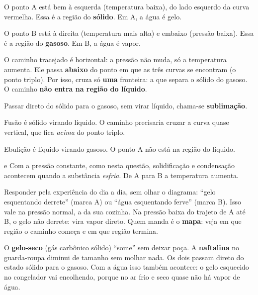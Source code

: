 \passoapasso
{}
O ponto A está bem à esquerda (temperatura baixa), do lado esquerdo da curva vermelha. Essa é a região do \textbf{sólido}. Em A, a água é gelo.

O ponto B está à direita (temperatura mais alta) e embaixo (pressão baixa). Essa é a região do \textbf{gasoso}. Em B, a água é vapor.

O caminho tracejado é horizontal: a pressão não muda, só a temperatura aumenta. Ele passa \textbf{abaixo} do ponto em que as
três curvas se encontram (o ponto triplo). Por isso, cruza só \textbf{uma} fronteira: a que separa o sólido do gasoso.
O caminho \textbf{não entra na região do líquido}.

Passar direto do sólido para o gasoso, sem virar líquido, chama-se \textbf{sublimação}.


\begin{outras}
 Fusão é sólido virando líquido. O caminho precisaria cruzar a curva quase vertical, que fica \emph{acima} do ponto triplo.\par
{} Ebulição é líquido virando gasoso. O ponto A não está na região do líquido.\par
{} e  Com a pressão constante, como nesta questão, solidificação e condensação acontecem quando a substância \emph{esfria}. De A para B a temperatura aumenta.
\end{outras}

\begin{pegadinha}
Responder pela experiência do dia a dia, sem olhar o diagrama: ``gelo esquentando derrete'' (marca A) ou ``água esquentando
ferve'' (marca B). Isso vale na pressão normal, a da sua cozinha. Na pressão baixa do trajeto de A até B, o gelo não derrete:
vira vapor direto. Quem manda é o \textbf{mapa}: veja em que região o caminho começa e em que região termina.
\end{pegadinha}

\begin{guardar}
O \textbf{gelo-seco} (gás carbônico sólido) ``some'' sem deixar poça. A \textbf{naftalina} no guarda-roupa diminui de tamanho
sem molhar nada. Os dois passam direto do estado sólido para o gasoso. Com a água isso também acontece: o gelo esquecido no
congelador vai encolhendo, porque no ar frio e seco quase não há vapor de água.
\end{guardar}
